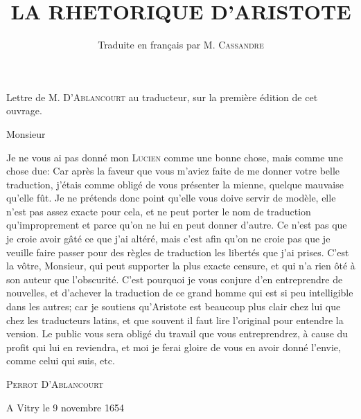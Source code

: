 \documentclass[11pt]{book}
\title{LA 
RHETORIQUE 
D'ARISTOTE}
\author{Traduite en français par M. \textsc{Cassandre}}
\begin{document}
\maketitle

Lettre de M. \textsc{D'Ablancourt} au traducteur, sur la première édition de cet ouvrage. 

Monsieur

Je ne vous ai pas donné mon \textsc{Lucien} comme une 
bonne chose, mais comme une chose due: Car après 
la faveur que vous m'aviez faite de me donner votre 
belle traduction, j'étais comme obligé de vous
présenter la mienne, quelque mauvaise qu'elle fût. Je ne 
prétends donc point qu'elle vous doive servir de modèle,
elle n'est pas assez exacte pour cela, et ne peut porter
le nom de traduction qu'improprement et parce 
qu'on ne lui en peut donner d'autre. Ce n'est pas que 
je croie avoir gâté ce que j'ai altéré, mais c'est afin 
qu'on ne croie pas que je veuille faire passer pour des 
règles de traduction les libertés que j'ai prises. C'est la 
vôtre, Monsieur, qui peut supporter la plus exacte censure, 
et qui n'a rien ôté à son auteur que l'obscurité. 
C'est pourquoi je vous conjure d'en entreprendre de 
nouvelles, et d'achever la traduction de ce grand 
homme qui est si peu intelligible dans les autres; car je 
soutiens qu'Aristote est beaucoup plus clair chez lui que 
chez les traducteurs latins, et que souvent il faut 
lire l'original pour entendre la version. Le public vous 
sera obligé du travail que vous entreprendrez, à cause 
du profit qui lui en reviendra, et moi je ferai gloire de 
vous en avoir donné l'envie, comme celui qui suis, etc.

\textsc{Perrot D'Ablancourt}

A Vitry le 9 novembre 1654

\tableofcontents




\end{document}
